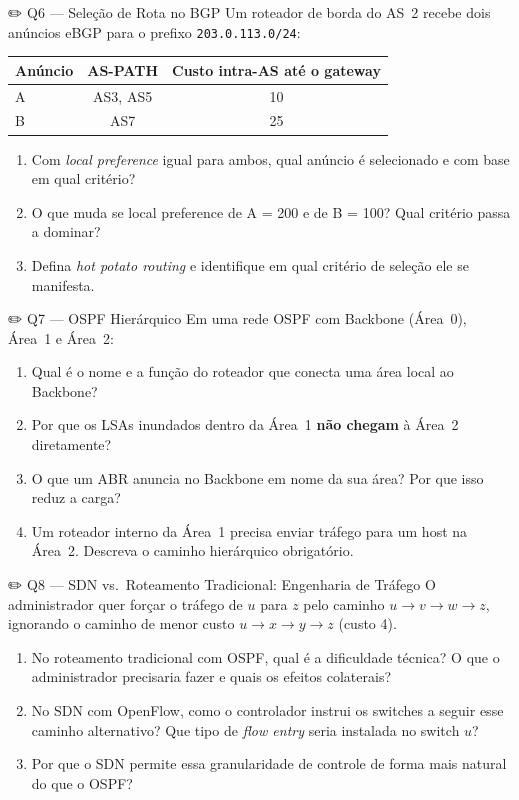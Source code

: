 \documentclass[11pt,a4paper]{article}
\begin{document}
\begin{questao}{✏️ Q6 --- Seleção de Rota no BGP}
Um roteador de borda do AS~2 recebe dois anúncios eBGP para o prefixo \texttt{203.0.113.0/24}:

\begin{center}
\begin{tabular}{lcc}
\toprule
\textbf{Anúncio} & \textbf{AS-PATH} & \textbf{Custo intra-AS até o gateway} \\
\midrule
A & AS3, AS5 & 10 \\
B & AS7 & 25 \\
\bottomrule
\end{tabular}
\end{center}

\begin{enumerate}[label=(\alph*)]
    \item Com \textit{local preference} igual para ambos, qual anúncio é selecionado e com base em qual critério?
    \item O que muda se local preference de A = 200 e de B = 100? Qual critério passa a dominar?
    \item Defina \textit{hot potato routing} e identifique em qual critério de seleção ele se manifesta.
\end{enumerate}
\end{questao}

\begin{questao}{✏️ Q7 --- OSPF Hierárquico}
Em uma rede OSPF com Backbone (Área~0), Área~1 e Área~2:
\begin{enumerate}[label=(\alph*)]
    \item Qual é o nome e a função do roteador que conecta uma área local ao Backbone?
    \item Por que os LSAs inundados dentro da Área~1 \textbf{não chegam} à Área~2 diretamente?
    \item O que um ABR anuncia no Backbone em nome da sua área? Por que isso reduz a carga?
    \item Um roteador interno da Área~1 precisa enviar tráfego para um host na Área~2. Descreva o caminho hierárquico obrigatório.
\end{enumerate}
\end{questao}

\begin{questao}{✏️ Q8 --- SDN vs.\ Roteamento Tradicional: Engenharia de Tráfego}
O administrador quer forçar o tráfego de $u$ para $z$ pelo caminho $u \to v \to w \to z$, ignorando o caminho de menor custo $u \to x \to y \to z$ (custo 4).
\begin{enumerate}[label=(\alph*)]
    \item No roteamento tradicional com OSPF, qual é a dificuldade técnica? O que o administrador precisaria fazer e quais os efeitos colaterais?
    \item No SDN com OpenFlow, como o controlador instrui os switches a seguir esse caminho alternativo? Que tipo de \textit{flow entry} seria instalada no switch $u$?
    \item Por que o SDN permite essa granularidade de controle de forma mais natural do que o OSPF?
\end{enumerate}
\end{questao}
\end{document}
